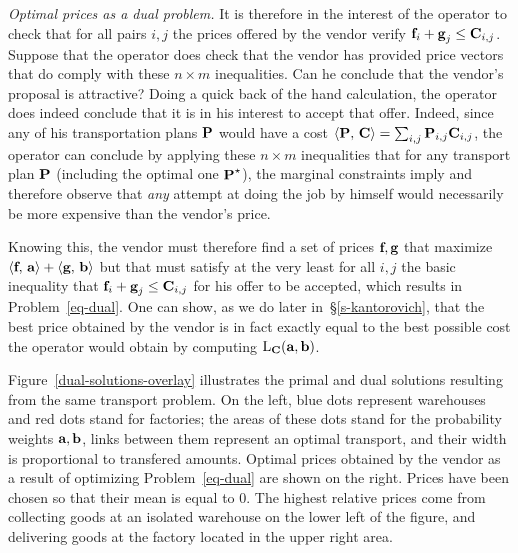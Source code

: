 \begin{rem}
\emph{Optimal prices as a dual problem.} It is therefore in the interest of the operator to check that for all pairs $i,j$ the prices offered by the vendor verify $\fD_i+\gD_j \leq \C_{i,j}$. Suppose that the operator does check that the vendor has provided price vectors that do comply with these $n\times m$ inequalities. Can he conclude that the vendor's proposal is attractive? Doing a quick back of the hand calculation, the operator does indeed conclude that it is in his interest to accept that offer. Indeed, since any of his transportation plans $\P$ would have a cost
$\dotp{\P}{\C}=\sum_{i,j} \P_{i,j}\C_{i,j}$, the operator can conclude by applying these $n\times m$ inequalities that for any transport plan $\P$ (including the optimal one $\P^\star$), the marginal constraints imply
and therefore observe that \emph{any} attempt at doing the job by himself would necessarily be more expensive than the vendor's price.

Knowing this, the vendor must therefore find a set of prices $\fD,\gD$ that maximize $\dotp{\fD}{\a}+\dotp{\gD}{\b}$ but that must satisfy at the very least for all $i,j$ the basic inequality that $\fD_i+\gD_j\leq \C_{i,j}$ for his offer to be accepted, which results in Problem~\eqref{eq-dual}. One can show, as we do later in~\S\ref{s-kantorovich}, that the best price obtained by the vendor is in fact exactly equal to the best possible cost the operator would obtain by computing $\MKD_{\C}(\a,\b)$.

Figure~\ref{dual-solutions-overlay} illustrates the primal and dual solutions resulting from the same transport problem. On the left, blue dots represent warehouses and red dots stand for factories; the areas of these dots stand for the probability weights $\a,\b$, links between them represent an optimal transport, and their width is proportional to transfered amounts. Optimal prices obtained by the vendor as a result of optimizing Problem~\eqref{eq-dual} are shown on the right. Prices have been chosen so that their mean is equal to 0. The highest relative prices come from collecting goods at an isolated warehouse on the lower left of the figure, and delivering goods at the factory located in the upper right area.
\end{rem}



